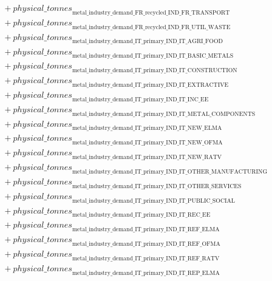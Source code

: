 \documentclass[11pt]{article}
\begin{document}
\begin{align*}
&\quad {}+ {physical\_tonnes}_{\text{metal\_industry\_demand\_FR\_recycled\_IND\_FR\_TRANSPORT}}\\
&\quad {}+ {physical\_tonnes}_{\text{metal\_industry\_demand\_FR\_recycled\_IND\_FR\_UTIL\_WASTE}}\\
&\quad {}+ {physical\_tonnes}_{\text{metal\_industry\_demand\_IT\_primary\_IND\_IT\_AGRI\_FOOD}}\\
&\quad {}+ {physical\_tonnes}_{\text{metal\_industry\_demand\_IT\_primary\_IND\_IT\_BASIC\_METALS}}\\
&\quad {}+ {physical\_tonnes}_{\text{metal\_industry\_demand\_IT\_primary\_IND\_IT\_CONSTRUCTION}}\\
&\quad {}+ {physical\_tonnes}_{\text{metal\_industry\_demand\_IT\_primary\_IND\_IT\_EXTRACTIVE}}\\
&\quad {}+ {physical\_tonnes}_{\text{metal\_industry\_demand\_IT\_primary\_IND\_IT\_INC\_EE}}\\
&\quad {}+ {physical\_tonnes}_{\text{metal\_industry\_demand\_IT\_primary\_IND\_IT\_METAL\_COMPONENTS}}\\
&\quad {}+ {physical\_tonnes}_{\text{metal\_industry\_demand\_IT\_primary\_IND\_IT\_NEW\_ELMA}}\\
&\quad {}+ {physical\_tonnes}_{\text{metal\_industry\_demand\_IT\_primary\_IND\_IT\_NEW\_OFMA}}\\
&\quad {}+ {physical\_tonnes}_{\text{metal\_industry\_demand\_IT\_primary\_IND\_IT\_NEW\_RATV}}\\
&\quad {}+ {physical\_tonnes}_{\text{metal\_industry\_demand\_IT\_primary\_IND\_IT\_OTHER\_MANUFACTURING}}\\
&\quad {}+ {physical\_tonnes}_{\text{metal\_industry\_demand\_IT\_primary\_IND\_IT\_OTHER\_SERVICES}}\\
&\quad {}+ {physical\_tonnes}_{\text{metal\_industry\_demand\_IT\_primary\_IND\_IT\_PUBLIC\_SOCIAL}}\\
&\quad {}+ {physical\_tonnes}_{\text{metal\_industry\_demand\_IT\_primary\_IND\_IT\_REC\_EE}}\\
&\quad {}+ {physical\_tonnes}_{\text{metal\_industry\_demand\_IT\_primary\_IND\_IT\_REF\_ELMA}}\\
&\quad {}+ {physical\_tonnes}_{\text{metal\_industry\_demand\_IT\_primary\_IND\_IT\_REF\_OFMA}}\\
&\quad {}+ {physical\_tonnes}_{\text{metal\_industry\_demand\_IT\_primary\_IND\_IT\_REF\_RATV}}\\
&\quad {}+ {physical\_tonnes}_{\text{metal\_industry\_demand\_IT\_primary\_IND\_IT\_REP\_ELMA}}\\

\end{align*}
\end{document}
